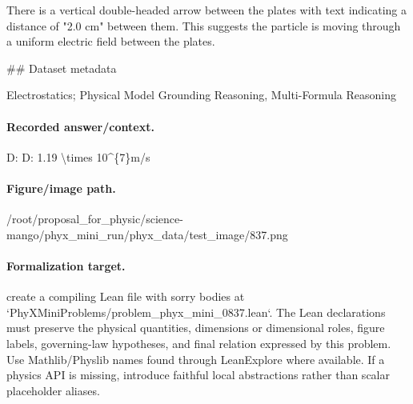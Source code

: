 There is a vertical double-headed arrow between the plates with text indicating a distance of "2.0 cm" between them. This suggests the particle is moving through a uniform electric field between the plates.

\#\# Dataset metadata

Electrostatics; Physical Model Grounding Reasoning, Multi-Formula Reasoning

\paragraph{Recorded answer/context.}
D: D: 1.19 \textbackslash{}times 10\textasciicircum{}\{7\}m/s

\paragraph{Figure/image path.}
/root/proposal\_for\_physic/science-mango/phyx\_mini\_run/phyx\_data/test\_image/837.png

\paragraph{Formalization target.}
create a compiling Lean file with sorry bodies at `PhyXMiniProblems/problem\_phyx\_mini\_0837.lean`. The Lean declarations must preserve the physical quantities, dimensions or dimensional roles, figure labels, governing-law hypotheses, and final relation expressed by this problem.
Use Mathlib/Physlib names found through LeanExplore where available. If a physics API is missing, introduce faithful local abstractions rather than scalar placeholder aliases.

